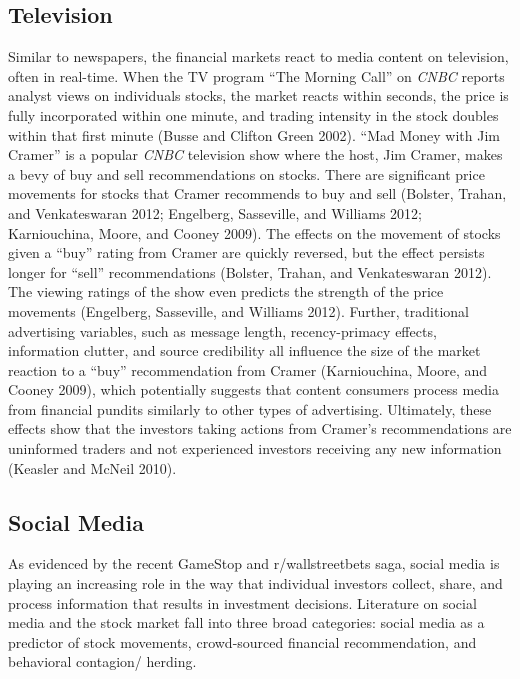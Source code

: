 \documentclass[12pt,]{article}
\begin{document}
\hypertarget{television}{%
\subsection{Television}\label{television}}

Similar to newspapers, the financial markets react to media content on
television, often in real-time. When the TV program ``The Morning Call''
on \emph{CNBC} reports analyst views on individuals stocks, the market
reacts within seconds, the price is fully incorporated within one
minute, and trading intensity in the stock doubles within that first
minute (Busse and Clifton Green 2002). ``Mad Money with Jim Cramer'' is
a popular \emph{CNBC} television show where the host, Jim Cramer, makes
a bevy of buy and sell recommendations on stocks. There are significant
price movements for stocks that Cramer recommends to buy and sell
(Bolster, Trahan, and Venkateswaran 2012; Engelberg, Sasseville, and
Williams 2012; Karniouchina, Moore, and Cooney 2009). The effects on the
movement of stocks given a ``buy'' rating from Cramer are quickly
reversed, but the effect persists longer for ``sell'' recommendations
(Bolster, Trahan, and Venkateswaran 2012). The viewing ratings of the
show even predicts the strength of the price movements (Engelberg,
Sasseville, and Williams 2012). Further, traditional advertising
variables, such as message length, recency-primacy effects, information
clutter, and source credibility all influence the size of the market
reaction to a ``buy'' recommendation from Cramer (Karniouchina, Moore,
and Cooney 2009), which potentially suggests that content consumers
process media from financial pundits similarly to other types of
advertising. Ultimately, these effects show that the investors taking
actions from Cramer's recommendations are uninformed traders and not
experienced investors receiving any new information (Keasler and McNeil
2010).

\hypertarget{social-media}{%
\subsection{Social Media}\label{social-media}}

As evidenced by the recent GameStop and r/wallstreetbets saga, social
media is playing an increasing role in the way that individual investors
collect, share, and process information that results in investment
decisions. Literature on social media and the stock market fall into
three broad categories: social media as a predictor of stock movements,
crowd-sourced financial recommendation, and behavioral contagion/
herding.
\end{document}
